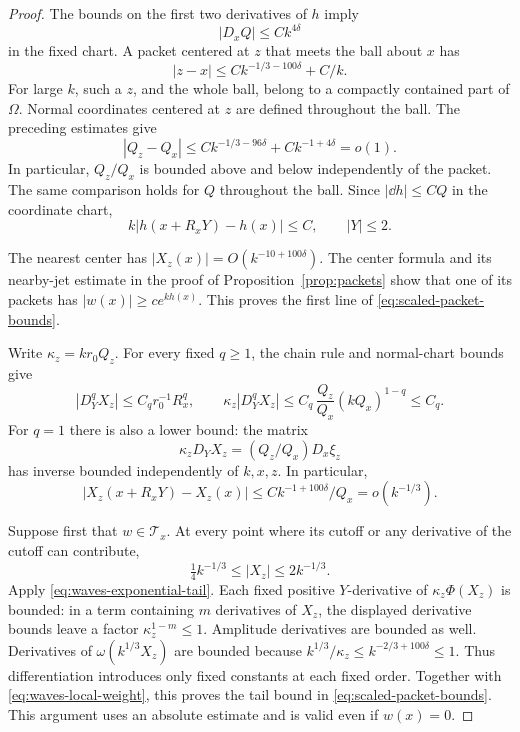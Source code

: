 \begin{proof}
The bounds on the first two derivatives of \(h\) imply
\[
 |D_xQ|\le Ck^{4\delta}
\]
in the fixed chart. A packet centered at \(z\) that meets the ball
about \(x\) has
\[
 |z-x|\le Ck^{-1/3-100\delta}+C/k.
\]
For large \(k\), such a \(z\), and the whole ball, belong to a
compactly contained part of \(\Omega\). Normal coordinates centered
at \(z\) are defined throughout the ball. The preceding estimates
give
\[
 |Q_z-Q_x|
 \le Ck^{-1/3-96\delta}+Ck^{-1+4\delta}=o(1).
\]
In particular, \(Q_z/Q_x\) is bounded above and below independently
of the packet. The same comparison holds for \(Q\) throughout the
ball. Since \(|\dd h|\le CQ\) in the coordinate chart,
\begin{equation}\label{eq:waves-local-weight}
 k|h(x+R_xY)-h(x)|\le C,\qquad |Y|\le2.
\end{equation}

The nearest center has
\(|X_z(x)|=O(k^{-10+100\delta})\).
The center formula and its nearby-jet estimate in the proof of
Proposition~\ref{prop:packets} show that one of its packets has
\(|w(x)|\ge c e^{kh(x)}\). This proves the first line of
\eqref{eq:scaled-packet-bounds}.

Write \(\kappa_z=kr_0Q_z\). For every fixed \(q\ge1\), the chain
rule and normal-chart bounds give
\[
 |D_Y^qX_z|\le C_qr_0^{-1}R_x^q,\qquad
 \kappa_z|D_Y^qX_z|
 \le C_q\,\frac{Q_z}{Q_x}(kQ_x)^{1-q}\le C_q.
\]
For \(q=1\) there is also a lower bound: the matrix
\begin{equation}\label{eq:waves-scaled-jacobian}
 \kappa_z D_YX_z=(Q_z/Q_x)D_x\xi_z
\end{equation}
has inverse bounded independently of \(k,x,z\).
In particular,
\[
 |X_z(x+R_xY)-X_z(x)|
 \le Ck^{-1+100\delta}/Q_x=o(k^{-1/3}).
\]

Suppose first that \(w\in\mathcal T_x\).
At every point where its cutoff or any derivative of the cutoff can
contribute,
\[
 \tfrac14k^{-1/3}\le |X_z|\le2k^{-1/3}.
\]
Apply \eqref{eq:waves-exponential-tail}. Each fixed positive
\(Y\)-derivative of \(\kappa_z\Phi(X_z)\) is bounded: in a term
containing \(m\) derivatives of \(X_z\), the displayed derivative
bounds leave a factor \(\kappa_z^{1-m}\le1\).
Amplitude derivatives are bounded as well.
Derivatives of \(\omega(k^{1/3}X_z)\) are bounded because
\(k^{1/3}/\kappa_z\le k^{-2/3+100\delta}\le1\).
Thus differentiation introduces only fixed constants at each fixed
order. Together with \eqref{eq:waves-local-weight}, this proves
the tail bound in \eqref{eq:scaled-packet-bounds}.
This argument uses an absolute estimate and is valid even if
\(w(x)=0\).


\end{proof}
